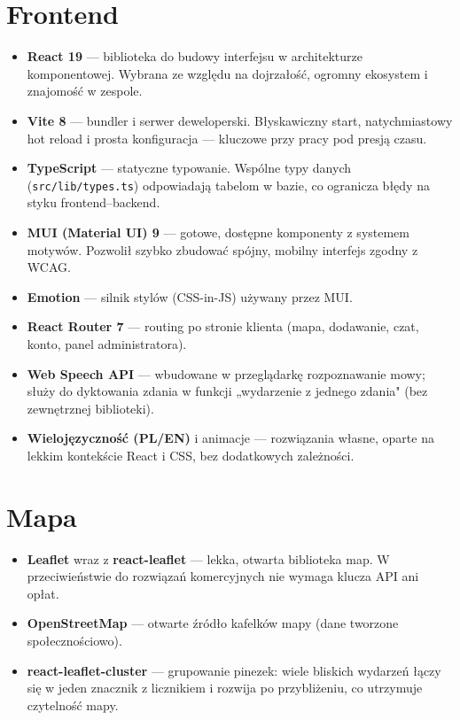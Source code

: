 \documentclass[11pt,a4paper]{article}
\begin{document}
\section{Frontend}

\begin{itemize}
  \item \textbf{React 19} --- biblioteka do budowy interfejsu w architekturze komponentowej.
        Wybrana ze względu na dojrzałość, ogromny ekosystem i znajomość w zespole.
  \item \textbf{Vite 8} --- bundler i serwer deweloperski. Błyskawiczny start, natychmiastowy
        hot reload i prosta konfiguracja --- kluczowe przy pracy pod presją czasu.
  \item \textbf{TypeScript} --- statyczne typowanie. Wspólne typy danych (\texttt{src/lib/types.ts})
        odpowiadają tabelom w bazie, co ogranicza błędy na styku frontend--backend.
  \item \textbf{MUI (Material UI) 9} --- gotowe, dostępne komponenty z systemem motywów.
        Pozwolił szybko zbudować spójny, mobilny interfejs zgodny z WCAG.
  \item \textbf{Emotion} --- silnik stylów (CSS-in-JS) używany przez MUI.
  \item \textbf{React Router 7} --- routing po stronie klienta (mapa, dodawanie, czat, konto, panel administratora).
  \item \textbf{Web Speech API} --- wbudowane w przeglądarkę rozpoznawanie mowy; służy do
        dyktowania zdania w funkcji „wydarzenie z jednego zdania" (bez zewnętrznej biblioteki).
  \item \textbf{Wielojęzyczność (PL/EN)} i animacje --- rozwiązania własne, oparte na lekkim
        kontekście React i CSS, bez dodatkowych zależności.
\end{itemize}

\section{Mapa}

\begin{itemize}
  \item \textbf{Leaflet} wraz z \textbf{react-leaflet} --- lekka, otwarta biblioteka map.
        W przeciwieństwie do rozwiązań komercyjnych nie wymaga klucza API ani opłat.
  \item \textbf{OpenStreetMap} --- otwarte źródło kafelków mapy (dane tworzone społecznościowo).
  \item \textbf{react-leaflet-cluster} --- grupowanie pinezek: wiele bliskich wydarzeń łączy się
        w jeden znacznik z licznikiem i rozwija po przybliżeniu, co utrzymuje czytelność mapy.
\end{itemize}
\end{document}
